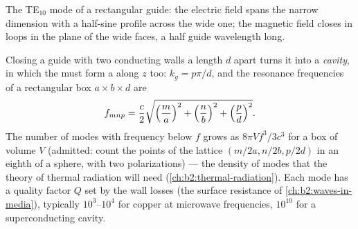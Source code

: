 \begin{omfigure}

{\small The TE$_{10}$ mode of a rectangular guide: the electric field
spans the narrow dimension with a half-sine profile across the wide
one; the magnetic field closes in loops in the plane of the wide
faces, a half guide wavelength long.}
\end{omfigure}

\begin{proposition}\label{prop:b2:guided-waves:cavity}
Closing a guide with two conducting walls a length $d$ apart turns it
into a \emph{cavity}, in which the  must form a  along $z$ too: $k_g = p\pi/d$, and the resonance frequencies of a
rectangular box $a \times b \times d$ are
\[
f_{mnp} = \frac c2\sqrt{\Bigl(\frac ma\Bigr)^2 + \Bigl(\frac nb\Bigr)^2 + \Bigl(\frac pd\Bigr)^2} .
\]
The number of modes with frequency below $f$ grows as $8\pi V f^3/3c^3$ for
a box of volume $V$ (admitted: count the points of the lattice
$(m/2a, n/2b, p/2d)$ in an eighth of a sphere, with two polarizations)
--- the density of modes that the theory of thermal radiation will
need (\cref{ch:b2:thermal-radiation}). Each mode has a quality factor
$Q$ set by the wall losses (the surface resistance of
\cref{ch:b2:waves-in-media}), typically $10^3$--$10^4$ for copper at
microwave frequencies, $10^{10}$ for a superconducting cavity.
\end{proposition}

